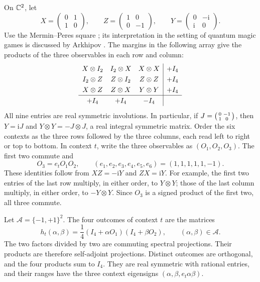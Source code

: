 On \(\mathbb C^2\), let
\[
 X=\begin{pmatrix}0&1\\1&0\end{pmatrix},\qquad
 Z=\begin{pmatrix}1&0\\0&-1\end{pmatrix},\qquad
 Y=\begin{pmatrix}0&-\mathrm i\\ \mathrm i&0\end{pmatrix}.
\]
Use the Mermin--Peres square
\cite{Mermin1990,Peres1990,Peres1991}; its interpretation in the
setting of quantum magic games is discussed by Arkhipov
\cite{Arkhipov2012}.  The margins in the following array give the
products of the three observables in each row and column:
\begin{equation}\label{eq:combinatorial-parity-square}
 \renewcommand{\arraystretch}{1.25}
 \begin{array}{ccc|c}
  X\otimes I_2&I_2\otimes X&X\otimes X&+I_4\\
  I_2\otimes Z&Z\otimes I_2&Z\otimes Z&+I_4\\
  X\otimes Z&Z\otimes X&Y\otimes Y&+I_4\\\hline
  +I_4&+I_4&-I_4&
 \end{array}
\end{equation}
All nine entries are real symmetric involutions.  In particular, if
\(J=\begin{psmallmatrix}0&-1\\1&0\end{psmallmatrix}\), then
\(Y=\mathrm iJ\) and \(Y\otimes Y=-J\otimes J\), a real integral
symmetric matrix.  Order the six contexts as the three rows followed
by the three columns, each read left to right or top to bottom.  In
context \(t\), write the three observables as \((O_1,O_2,O_3)\).
The first two commute and
\begin{equation}\label{eq:combinatorial-context-signs}
 O_3=e_tO_1O_2,\qquad
 (e_1,e_2,e_3,e_4,e_5,e_6)=(1,1,1,1,1,-1).
\end{equation}
These identities follow from \(XZ=-\mathrm iY\) and
\(ZX=\mathrm iY\).  For example, the first two entries of the last
row multiply, in either order, to \(Y\otimes Y\); those of the last
column multiply, in either order, to \(-Y\otimes Y\).
Since \(O_3\) is a signed product of the first two, all three commute.

Let \(\mathcal A=\{-1,+1\}^2\).  The four outcomes of context \(t\)
are the matrices
\begin{equation}\label{eq:combinatorial-context-projections}
 h_t(\alpha,\beta)
 =\frac14(I_4+\alpha O_1)(I_4+\beta O_2),
 \qquad (\alpha,\beta)\in\mathcal A.
\end{equation}
The two factors divided by two are commuting spectral projections.
Their products are therefore self-adjoint projections.  Distinct
outcomes are orthogonal, and the four products sum to \(I_4\).
They are real symmetric with rational entries, and their ranges have
the three context eigensigns
\((\alpha,\beta,e_t\alpha\beta)\).


